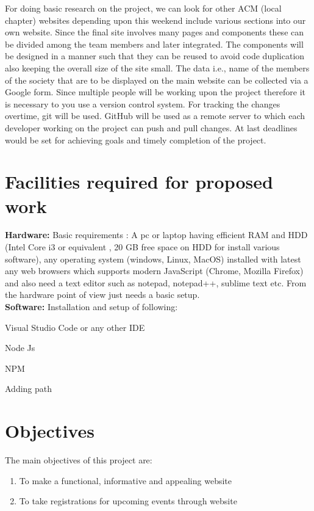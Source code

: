 \documentclass[english]{article}
\begin{document}
For doing basic research on the project, we can look for other ACM
(local chapter) websites depending upon this weekend include various
sections into our own website. Since the final site involves many
pages and components these can be divided among the team members and
later integrated. The components will be designed in a manner such
that they can be reused to avoid code duplication also keeping the
overall size of the site small. The data i.e., name of the members
of the society that are to be displayed on the main website can be
collected via a Google form. Since multiple people will be working
upon the project therefore it is necessary to you use a version control
system. For tracking the changes overtime, git will be used. GitHub
will be used as a remote server to which each developer working on
the project can push and pull changes. At last deadlines would be
set for achieving goals and timely completion of the project. 

\newpage{}

\section{Facilities required for proposed work }

\textbf{Hardware:} Basic requirements : A pc or laptop having efficient
RAM and HDD (Intel Core i3 or equivalent , 20 GB free space on HDD
for install various software), any operating system (windows, Linux,
MacOS) installed with latest any web browsers which supports modern
JavaScript (Chrome, Mozilla Firefox) and also need a text editor such
as notepad, notepad++, sublime text etc. From the hardware point of
view just needs a basic setup.\\

\noindent \textbf{Software:} Installation and setup of following: 

\textbullet{} Visual Studio Code or any other IDE 

\textbullet{} Node Js

\textbullet{} NPM 

\textbullet{} Adding path 

\newpage{}

\section{Objectives }

The main objectives of this project are: 
\begin{enumerate}
\item To make a functional, informative and appealing website
\item To take registrations for upcoming events through website
\end{enumerate}
\newpage{}
\end{document}
